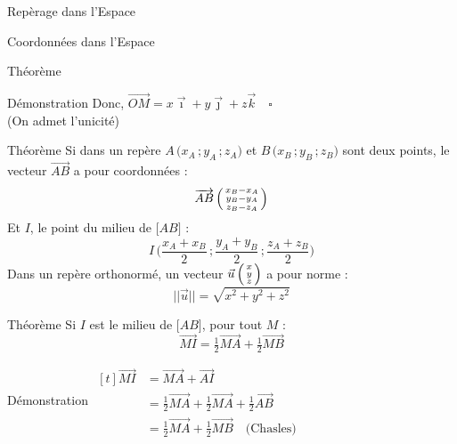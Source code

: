 \documentclass{cours}
\begin{document}
\begin{Gpartie}{Repèrage dans l'Espace}
\begin{Spartie}{Coordonnées dans l'Espace}
\begin{SSpartie}{Théorème}
\begin{SSSpartie}{Démonstration}
                    Donc, $\overrightarrow{OM}=x\vec{\imath}+y\vec{\jmath}+z\vec{k}\quad\square$ \\
                    (On admet l'unicité)
                \end{SSSpartie}
            \end{SSpartie}
            \begin{SSpartie}{Théorème} 
                Si dans un repère $A\,\big(x_A\,;y_A\,;z_A\big)$ et $B\,\big(x_B\,;y_B\,;z_B\big)$ sont deux points, le vecteur $\overrightarrow{AB}$ a pour coordonnées : 
                \[\overrightarrow{AB}\,\begin{psmallmatrix} x_B-x_A \\ y_B-y_A \\ z_B-z_A \end{psmallmatrix}\]
                Et $I$, le point du milieu de $\big[AB\big]$ :
                \[I\,\Bigg(\frac{x_A+x_B}{2}\,;\frac{y_A+y_B}{2}\,;\frac{z_A+z_B}{2}\Bigg)\]
                Dans un repère orthonormé, un vecteur $\vec{u}\,\begin{psmallmatrix}x \\ y \\ z\end{psmallmatrix}$ a pour norme :
                \[\lvert\lvert\vec{u}\rvert\rvert=\sqrt{x^2+y^2+z^2}\]
            \end{SSpartie}
            \begin{SSpartie}{Théorème} 
                Si $I$ est le milieu de $\big[AB\big]$, pour tout $M$ :
                \[\overrightarrow{MI}=\tfrac{1}{2}\overrightarrow{MA}+\tfrac{1}{2}\overrightarrow{MB}\]
                \begin{SSSpartie}{Démonstration} 
                    $\begin{aligned}[t]
                        \overrightarrow{MI}&=\overrightarrow{MA}+\overrightarrow{AI} \\
                        &=\tfrac{1}{2}\overrightarrow{MA}+\tfrac{1}{2}\overrightarrow{MA}+\tfrac{1}{2}\overrightarrow{AB} \\
                        &=\tfrac{1}{2}\overrightarrow{MA}+\tfrac{1}{2}\overrightarrow{MB}\quad\text{(Chasles)}
                    \end{aligned}$
                \end{SSSpartie}
            \end{SSpartie}
        \end{Spartie}
    \end{Gpartie}
\end{document}

